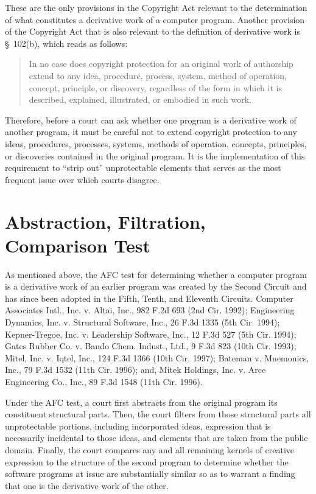 These are the only provisions in the Copyright Act relevant to the
determination of what constitutes a derivative work of a computer
program. Another provision of the Copyright Act that is also relevant to
the definition of derivative work is \S~102(b), which reads as follows:

\begin{quotation}
In no case does copyright protection for an original work of authorship
extend to any idea, procedure, process, system, method of operation,
concept, principle, or discovery, regardless of the form in which it is
described, explained, illustrated, or embodied in such work.
\end{quotation}

Therefore, before a court can ask whether one program is a derivative work
of another program, it must be careful not to extend copyright protection
to any ideas, procedures, processes, systems, methods of operation,
concepts, principles, or discoveries contained in the original program. It
is the implementation of this requirement to ``strip out'' unprotectable
elements that serves as the most frequent issue over which courts
disagree.

\section{Abstraction, Filtration, Comparison Test}

As mentioned above, the AFC test for determining whether a computer
program is a derivative work of an earlier program was created by the
Second Circuit and has since been adopted in the Fifth, Tenth, and
Eleventh Circuits. Computer Associates Intl., Inc. v. Altai, Inc., 982
F.2d 693 (2nd Cir. 1992); Engineering Dynamics, Inc. v. Structural
Software, Inc., 26 F.3d 1335 (5th Cir. 1994); Kepner-Tregoe,
Inc. v. Leadership Software, Inc., 12 F.3d 527 (5th Cir. 1994); Gates
Rubber Co. v. Bando Chem. Indust., Ltd., 9 F.3d 823 (10th Cir. 1993);
Mitel, Inc. v. Iqtel, Inc., 124 F.3d 1366 (10th Cir. 1997); Bateman
v. Mnemonics, Inc., 79 F.3d 1532 (11th Cir. 1996); and, Mitek Holdings,
Inc. v. Arce Engineering Co., Inc., 89 F.3d 1548 (11th Cir. 1996).

Under the AFC test, a court first abstracts from the original program its
constituent structural parts. Then, the court filters from those
structural parts all unprotectable portions, including incorporated ideas,
expression that is necessarily incidental to those ideas, and elements
that are taken from the public domain. Finally, the court compares any and
all remaining kernels of creative expression to the structure of the
second program to determine whether the software programs at issue are
substantially similar so as to warrant a finding that one is the
derivative work of the other.

